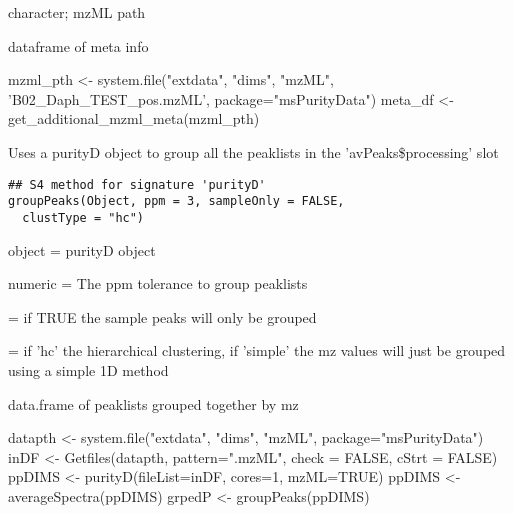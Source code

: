 \documentclass[letterpaper]{book}
\begin{document}
%
\begin{Arguments}
\begin{ldescription}
\item[\code{mzml\_pth}] character; mzML path
\end{ldescription}
\end{Arguments}
%
\begin{Value}
dataframe of meta info
\end{Value}
%
\begin{Examples}
\begin{ExampleCode}
mzml_pth <- system.file("extdata", "dims", "mzML", 'B02_Daph_TEST_pos.mzML', package="msPurityData")
meta_df <- get_additional_mzml_meta(mzml_pth)
\end{ExampleCode}
\end{Examples}
%
\begin{Description}\relax
Uses a purityD object to group all the peaklists in the 'avPeaks\$processing' slot
\end{Description}
%
\begin{Usage}
\begin{verbatim}
## S4 method for signature 'purityD'
groupPeaks(Object, ppm = 3, sampleOnly = FALSE,
  clustType = "hc")
\end{verbatim}
\end{Usage}
%
\begin{Arguments}
\begin{ldescription}
\item[\code{Object}] object = purityD object

\item[\code{ppm}] numeric = The ppm tolerance to group peaklists

\item[\code{sampleOnly}] = if TRUE the sample peaks will only be grouped

\item[\code{clustType}] = if 'hc' the hierarchical clustering, if 'simple' the mz values will just be grouped using a simple 1D method
\end{ldescription}
\end{Arguments}
%
\begin{Value}
data.frame of peaklists grouped together by mz
\end{Value}
%
\begin{Examples}
\begin{ExampleCode}

datapth <- system.file("extdata", "dims", "mzML", package="msPurityData")
inDF <- Getfiles(datapth, pattern=".mzML", check = FALSE, cStrt = FALSE)
ppDIMS <- purityD(fileList=inDF, cores=1, mzML=TRUE)
ppDIMS <- averageSpectra(ppDIMS)
grpedP <- groupPeaks(ppDIMS)
\end{ExampleCode}
\end{Examples}
\end{document}

